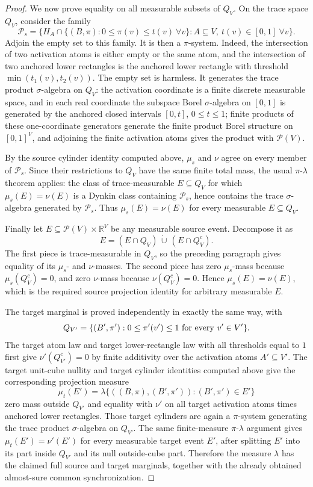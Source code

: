 \begin{proof}
We now prove equality on all measurable subsets of \(Q_V\).  On the trace
space \(Q_V\), consider the family
\[
  \mathcal P_s=
  \{H_A\cap\{(B,\pi):0\le \pi(v)\le t(v)\ \forall v\}:
    A\subseteq V,\ t(v)\in[0,1]\ \forall v\}.
\]
Adjoin the empty set to this family. It is then a \(\pi\)-system. Indeed,
the intersection of two activation
atoms is either empty or the same atom, and the intersection of two anchored
lower rectangles is the anchored lower rectangle with threshold
\(\min(t_1(v),t_2(v))\).  The empty set is harmless.  It generates the trace
product \(\sigma\)-algebra on \(Q_V\): the activation coordinate is a finite
discrete measurable space, and in each real coordinate the subspace Borel
\(\sigma\)-algebra on \([0,1]\) is generated by the anchored closed intervals
\([0,t]\), \(0\le t\le1\); finite products of these one-coordinate generators
generate the finite product Borel structure on \([0,1]^V\), and adjoining the
finite activation atoms gives the product with \(\mathcal P(V)\).

By the source cylinder identity computed above,
\(\mu_s\) and \(\nu\) agree on every member of \(\mathcal P_s\).  Since their
restrictions to \(Q_V\) have the same finite total mass, the usual
\(\pi\)-\(\lambda\) theorem applies: the class of trace-measurable
\(E\subseteq Q_V\) for which \(\mu_s(E)=\nu(E)\) is a Dynkin class containing
\(\mathcal P_s\), hence contains the trace \(\sigma\)-algebra generated by
\(\mathcal P_s\).  Thus \(\mu_s(E)=\nu(E)\) for every measurable
\(E\subseteq Q_V\).

Finally let \(E\subseteq \mathcal P(V)\times\mathbb R^V\) be any measurable
source event.  Decompose it as
\[
  E=(E\cap Q_V)\,\dot\cup\,(E\cap Q_V^c).
\]
The first piece is trace-measurable in \(Q_V\), so the preceding paragraph
gives equality of its \(\mu_s\)- and \(\nu\)-masses.  The second piece has
zero \(\mu_s\)-mass because \(\mu_s(Q_V^c)=0\), and zero \(\nu\)-mass because
\(\nu(Q_V^c)=0\).  Hence \(\mu_s(E)=\nu(E)\), which is the required source
projection identity for arbitrary measurable \(E\).

The target marginal is proved independently in exactly the same way, with
\[
  Q_{V'}=\{(B',\pi'):0\le \pi'(v')\le1\hbox{ for every }v'\in V'\}.
\]
The target atom law and target lower-rectangle law with all thresholds equal
to \(1\) first give \(\nu'(Q_{V'}^c)=0\) by finite additivity over the
activation atoms \(A'\subseteq V'\).  The target unit-cube nullity and target
cylinder identities computed above
give the corresponding projection measure
\[
  \mu_t(E')=\lambda\{((B,\pi),(B',\pi')):(B',\pi')\in E'\}
\]
zero mass outside \(Q_{V'}\) and equality with \(\nu'\) on all target
activation atoms times anchored lower rectangles.  Those target cylinders are
again a \(\pi\)-system generating the trace product \(\sigma\)-algebra on
\(Q_{V'}\).  The same finite-measure \(\pi\)-\(\lambda\) argument gives
\(\mu_t(E')=\nu'(E')\) for every measurable target event \(E'\), after
splitting \(E'\) into its part inside \(Q_{V'}\) and its null outside-cube
part.  Therefore the measure \(\lambda\) has the claimed full source and
target marginals, together with the already obtained almost-sure common
synchronization.
\end{proof}
